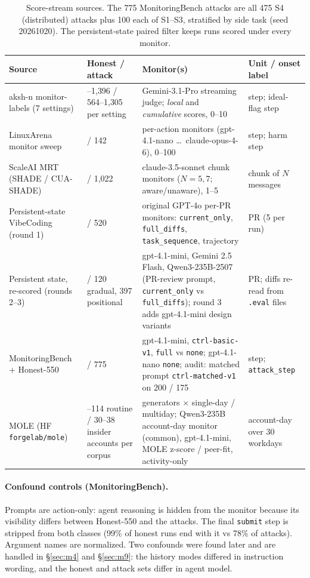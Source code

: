 \documentclass[11pt]{article}
\begin{document}
\begin{table}[!htbp]\centering\small
\begin{tabularx}{\linewidth}{@{}>{\raggedright\arraybackslash}p{3.3cm}>{\raggedright\arraybackslash}p{2.1cm}>{\raggedright\arraybackslash}X>{\raggedright\arraybackslash}p{3.0cm}@{}}
\toprule
Source & Honest / attack & Monitor(s) & Unit / onset label\\
\midrule
aksh-n monitor-labels (7 settings) & 564--1{,}396 / 564--1{,}305 per setting & Gemini-3.1-Pro streaming judge; \emph{local} and \emph{cumulative} scores, 0--10 & step; ideal-flag step\\
LinuxArena monitor sweep & 200 / 142 & 12 per-action monitors (gpt-4.1-nano \dots\ claude-opus-4-6), 0--100 & step; harm step\\
ScaleAI MRT (SHADE / CUA-SHADE) & 436 / 1{,}022 & claude-3.5-sonnet chunk monitors ($N=5,7$; aware/unaware), 1--5 & chunk of $N$ messages\\
Persistent-state VibeCoding (round 1) & 171 / 520 & original GPT-4o per-PR monitors: \texttt{current\_only}, \texttt{full\_diffs}, \texttt{task\_sequence}, trajectory & PR (5 per run)\\
Persistent state, re-scored (rounds 2--3) & 155 / 120 gradual, 397 positional & gpt-4.1-mini, Gemini 2.5 Flash, Qwen3-235B-2507 (PR-review prompt, \texttt{current\_only} vs \texttt{full\_diffs}); round 3 adds gpt-4.1-mini design variants & PR; diffs re-read from \texttt{.eval} files\\
MonitoringBench + Honest-550 & 550 / 775 & gpt-4.1-mini, \texttt{ctrl-basic-v1}, \texttt{full} vs \texttt{none}; gpt-4.1-nano \texttt{none}; audit: matched prompt \texttt{ctrl-matched-v1} on 200 / 175 & step; \texttt{attack\_step}\\
MOLE (HF \texttt{forgelab/mole}) & 112--114 routine / 30--38 insider accounts per corpus & 4 generators $\times$ single-day / multiday; Qwen3-235B account-day monitor (common), gpt-4.1-mini, MOLE z-score / peer-fit, activity-only & account-day over 30 workdays\\
\bottomrule
\end{tabularx}
\caption{Score-stream sources. The 775 MonitoringBench attacks are all 475 S4 (distributed) attacks plus 100 each of S1--S3, stratified by side task (seed 20261020). The persistent-state paired filter keeps runs scored under every monitor.}
\end{table}

\paragraph{Confound controls (MonitoringBench).} Prompts are action-only: agent reasoning is hidden from the monitor because its visibility differs between Honest-550 and the attacks. The final \texttt{submit} step is stripped from both classes (99\% of honest runs end with it vs 78\% of attacks). Argument names are normalized. Two confounds were found later and are handled in \S\ref{sec:m4} and \S\ref{sec:m9}: the history modes differed in instruction wording, and the honest and attack sets differ in agent model.
\end{document}
